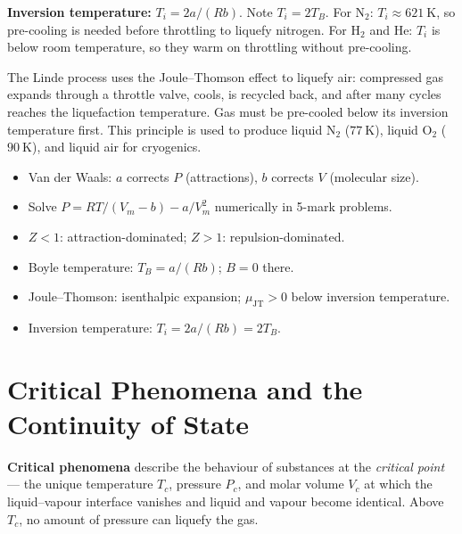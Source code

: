 \documentclass[12pt,a4paper]{article}
\begin{document}
\textbf{Inversion temperature:} $T_i = 2a/(Rb)$. Note $T_i = 2T_B$. For $\mathrm{N_2}$: $T_i\approx 621\ \mathrm{K}$, so pre-cooling is needed before throttling to liquefy nitrogen. For $\mathrm{H_2}$ and $\mathrm{He}$: $T_i$ is below room temperature, so they warm on throttling without pre-cooling.

\begin{tcolorbox}[masonbox, title={Linde Liquefaction Process and Joule--Thomson Effect}]
The Linde process uses the Joule--Thomson effect to liquefy air: compressed gas expands through a throttle valve, cools, is recycled back, and after many cycles reaches the liquefaction temperature. Gas must be pre-cooled below its inversion temperature first. This principle is used to produce liquid $\mathrm{N_2}$ ($77\ \mathrm{K}$), liquid $\mathrm{O_2}$ ($90\ \mathrm{K}$), and liquid air for cryogenics.
\end{tcolorbox}

\begin{tcolorbox}[exambox, title={Exam Points (Section 3)}]
\begin{itemize}[leftmargin=*, itemsep=2pt, topsep=2pt]
  \item Van der Waals: $a$ corrects $P$ (attractions), $b$ corrects $V$ (molecular size).
  \item Solve $P = RT/(V_m-b) - a/V_m^2$ numerically in 5-mark problems.
  \item $Z < 1$: attraction-dominated; $Z > 1$: repulsion-dominated.
  \item Boyle temperature: $T_B = a/(Rb)$; $B = 0$ there.
  \item Joule--Thomson: isenthalpic expansion; $\mu_{\mathrm{JT}} > 0$ below inversion temperature.
  \item Inversion temperature: $T_i = 2a/(Rb) = 2T_B$.
\end{itemize}
\end{tcolorbox}

\section{Critical Phenomena and the Continuity of State}

\begin{tcolorbox}[defbox]
\textbf{Critical phenomena} describe the behaviour of substances at the \emph{critical point} --- the unique temperature $T_c$, pressure $P_c$, and molar volume $V_c$ at which the liquid--vapour interface vanishes and liquid and vapour become identical. Above $T_c$, no amount of pressure can liquefy the gas.
\end{tcolorbox}
\end{document}
